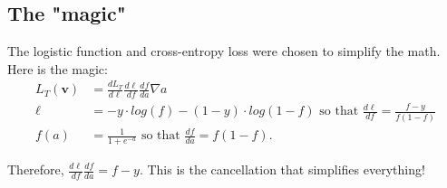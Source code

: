 \documentclass[titlepage, 12pt, leqno]{article}
\begin{document}
\subsection{The "magic"}
The logistic function and cross-entropy loss were chosen to simplify the math. Here is
the magic:
\begin{align*}
    L_{T}(\textbf{v}) &= \frac{dL_{T}}{d\ell}\frac{d\ell}{df}\frac{df}{da}\nabla a\\
    \ell &= -y\cdot log(f) - (1-y)\cdot log(1-f) \text{ so that }
    \frac{d\ell}{df} = \frac{f-y}{f(1-f)}\\
    f(a) &= \frac{1}{1+e^{-a}} \text{ so that } \frac{df}{da} = f(1-f).
\end{align*}

Therefore, $\frac{d\ell}{df}\frac{df}{da}=f-y$. This is the cancellation that simplifies
everything!
\end{document}
